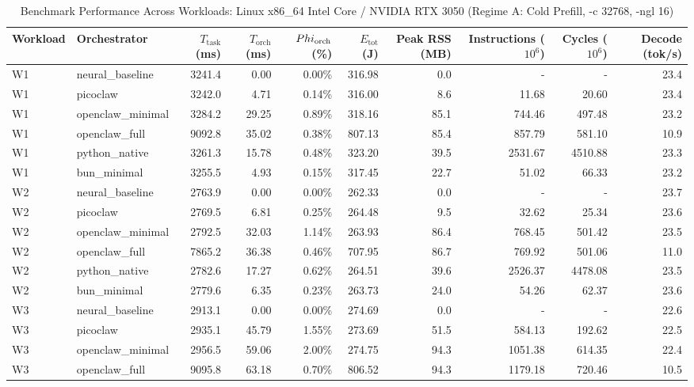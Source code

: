 \begin{table}[t]
\centering\small
\caption{Benchmark Performance Across Workloads: Linux x86_64 Intel Core / NVIDIA RTX 3050 (Regime A: Cold Prefill, -c 32768, -ngl 16)}
\label{tab:linux_master_summary}
\begin{tabular}{llrrrrrrrr}
\toprule
Workload & Orchestrator & $T_{\text{task}}$ (ms) & $T_{\text{orch}}$ (ms) & $\\Phi_{\text{orch}}$ (\%) & $E_{\text{tot}}$ (J) & Peak RSS (MB) & Instructions ($10^6$) & Cycles ($10^6$) & Decode (tok/s) \\
\midrule
W1 & neural\_baseline & 3241.4 & 0.00 & 0.00\% & 316.98 & 0.0 & - & - & 23.4 \\
W1 & picoclaw & 3242.0 & 4.71 & 0.14\% & 316.00 & 8.6 & 11.68 & 20.60 & 23.4 \\
W1 & openclaw\_minimal & 3284.2 & 29.25 & 0.89\% & 318.16 & 85.1 & 744.46 & 497.48 & 23.2 \\
W1 & openclaw\_full & 9092.8 & 35.02 & 0.38\% & 807.13 & 85.4 & 857.79 & 581.10 & 10.9 \\
W1 & python\_native & 3261.3 & 15.78 & 0.48\% & 323.20 & 39.5 & 2531.67 & 4510.88 & 23.3 \\
W1 & bun\_minimal & 3255.5 & 4.93 & 0.15\% & 317.45 & 22.7 & 51.02 & 66.33 & 23.2 \\
\midrule
W2 & neural\_baseline & 2763.9 & 0.00 & 0.00\% & 262.33 & 0.0 & - & - & 23.7 \\
W2 & picoclaw & 2769.5 & 6.81 & 0.25\% & 264.48 & 9.5 & 32.62 & 25.34 & 23.6 \\
W2 & openclaw\_minimal & 2792.5 & 32.03 & 1.14\% & 263.93 & 86.4 & 768.45 & 501.42 & 23.5 \\
W2 & openclaw\_full & 7865.2 & 36.38 & 0.46\% & 707.95 & 86.7 & 769.92 & 501.06 & 11.0 \\
W2 & python\_native & 2782.6 & 17.27 & 0.62\% & 264.51 & 39.6 & 2526.37 & 4478.08 & 23.5 \\
W2 & bun\_minimal & 2779.6 & 6.35 & 0.23\% & 263.73 & 24.0 & 54.26 & 62.37 & 23.6 \\
\midrule
W3 & neural\_baseline & 2913.1 & 0.00 & 0.00\% & 274.69 & 0.0 & - & - & 22.6 \\
W3 & picoclaw & 2935.1 & 45.79 & 1.55\% & 273.69 & 51.5 & 584.13 & 192.62 & 22.5 \\
W3 & openclaw\_minimal & 2956.5 & 59.06 & 2.00\% & 274.75 & 94.3 & 1051.38 & 614.35 & 22.4 \\
W3 & openclaw\_full & 9095.8 & 63.18 & 0.70\% & 806.52 & 94.3 & 1179.18 & 720.46 & 10.5 \\

\end{tabular}
\end{table}
